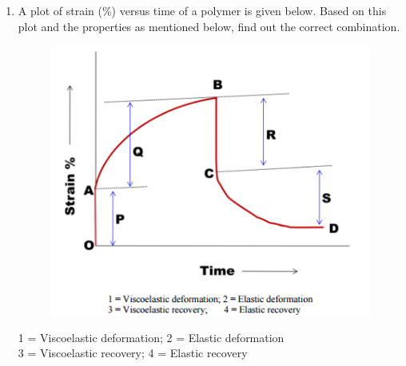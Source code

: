 \documentclass[a4paper,10pt]{article}
\begin{document}
\begin{enumerate}
    \item A plot of strain (\%) versus time of a polymer is given below. Based on this plot and the properties as mentioned below, find out the correct combination.
    \begin{figure}[H] \centering \includegraphics[width=0.7\columnwidth]{q15_poly_2018.png} \caption*{} \label{fig:q15_poly_2018} \end{figure}
    1 = Viscoelastic deformation; 2 = Elastic deformation \\
    3 = Viscoelastic recovery; 4 = Elastic recovery
    \hfill{}
    \begin{enumerate}[label=\Alph*)]
    \end{enumerate}


\end{enumerate}
\end{document}
